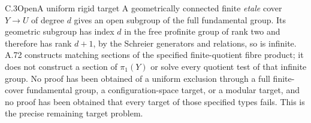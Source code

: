 \begin{result}{C.3}{Open}{A uniform rigid target}
A geometrically connected finite \emph{etale} cover \(Y\to U\) of degree
\(d\) gives an open subgroup of the full fundamental group.
Its geometric subgroup has index \(d\) in the free profinite
group of rank two and therefore has rank \(d+1\), by the
Schreier generators and relations, so is infinite. A.72 constructs matching sections of the
specified finite-quotient fibre product; it does not construct
a section of \(\pi_1(Y)\) or solve every quotient test of
that infinite group. No proof has been obtained of a uniform
exclusion through a full finite-cover fundamental group, a
configuration-space target, or a modular target, and no
proof has been obtained that every target of those specified
types fails. This is the precise remaining target problem.


\end{result}
